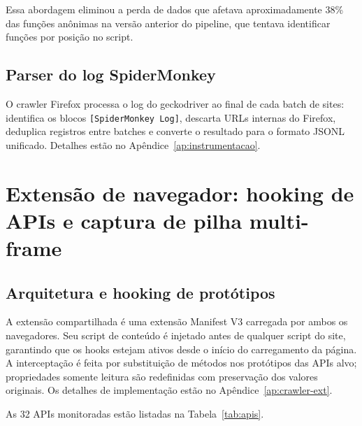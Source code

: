 Essa abordagem eliminou a perda de dados que afetava aproximadamente 38\% das
funções anônimas na versão anterior do pipeline, que tentava identificar funções
por posição no script.

\subsection{Parser do log SpiderMonkey}
\label{sub:sm-parser}

O crawler Firefox processa o log do geckodriver ao final de cada batch de
sites: identifica os blocos \texttt{[SpiderMonkey Log]}, descarta URLs internas
do Firefox, deduplica registros entre batches e converte o resultado para o
formato JSONL unificado. Detalhes estão no Apêndice~\ref{ap:instrumentacao}.

\section{Extensão de navegador: hooking de APIs e captura de pilha multi-frame}
\label{sec:extensao}

\subsection{Arquitetura e hooking de protótipos}
\label{sub:ext-arq}

A extensão compartilhada é uma extensão Manifest V3 carregada por ambos os
navegadores. Seu script de conteúdo é injetado antes de qualquer script do
site, garantindo que os hooks estejam ativos desde o início do carregamento da
página. A interceptação é feita por substituição de métodos nos protótipos das
APIs alvo; propriedades somente leitura são redefinidas com preservação dos
valores originais. Os detalhes de implementação estão no
Apêndice~\ref{ap:crawler-ext}.

As 32 APIs monitoradas estão listadas na Tabela~\ref{tab:apis}.

